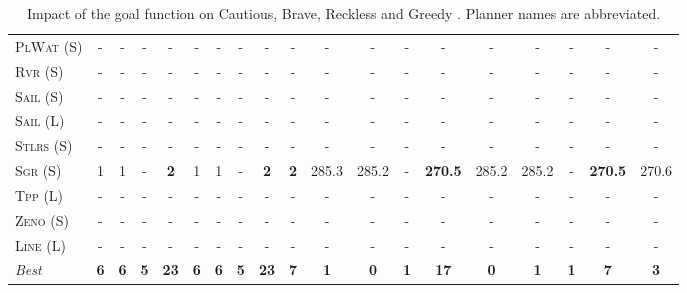 \begin{table}[tb]
{\begin{tabular}{|l||ccccccccc||ccccccccc||}
\textsc{PlWat} (S)&-&-&-&-&-&-&-&-&-&-&-&-&-&-&-&-&-&-\\
\textsc{Rvr} (S)&-&-&-&-&-&-&-&-&-&-&-&-&-&-&-&-&-&-\\
\textsc{Sail} (S)&-&-&-&-&-&-&-&-&-&-&-&-&-&-&-&-&-&-\\
\textsc{Sail} (L)&-&-&-&-&-&-&-&-&-&-&-&-&-&-&-&-&-&-\\
\textsc{Stlrs} (S)&-&-&-&-&-&-&-&-&-&-&-&-&-&-&-&-&-&-\\
\textsc{Sgr} (S)&1&1&-&\textbf{2}&1&1&-&\textbf{2}&\textbf{2}&285.3&285.2&-&\textbf{270.5}&285.2&285.2&-&\textbf{270.5}&270.6\\
\textsc{Tpp} (L)&-&-&-&-&-&-&-&-&-&-&-&-&-&-&-&-&-&-\\
\textsc{Zeno} (S)&-&-&-&-&-&-&-&-&-&-&-&-&-&-&-&-&-&-\\
\textsc{Line} (L)&-&-&-&-&-&-&-&-&-&-&-&-&-&-&-&-&-&-
\\\hline
\textit{Best}&\textbf{6}&\textbf{6}&\textbf{5}&\textbf{23}&\textbf{6}&\textbf{6}&\textbf{5}&\textbf{23}&\textbf{7}&\textbf{1}&\textbf{0}&\textbf{1}&\textbf{17}&\textbf{0}&\textbf{1}&\textbf{1}&\textbf{7}&\textbf{3}\\\hline

        \end{tabular}}
        \caption{Impact of the goal function on Cautious, Brave, Reckless and Greedy \pattyd. Planner names are abbreviated.}
        \label{tab:abl-gf}
        \end{table}
        
